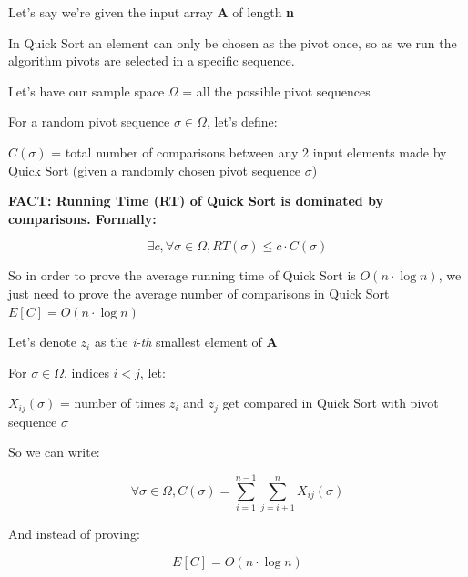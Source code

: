 \documentclass{article}
\begin{document}
Let's say we're given the input array \textbf{A} of length \textbf{n}

\bigskip

\noindent In Quick Sort an element can only be chosen as the pivot once, so as we run the algorithm pivots are selected in a specific sequence.

\bigskip

\noindent Let's have our sample space $\Omega$ = all the possible pivot sequences

\bigskip

\noindent For a random pivot sequence $\sigma \in \Omega$, let's define:

\bigskip

$C(\sigma)$ = total number of comparisons between any 2 input elements made by Quick Sort (given a randomly chosen pivot sequence $\sigma$)

\bigskip

\noindent \textbf{FACT: Running Time (RT) of Quick Sort is dominated by comparisons. Formally:}

\begin{equation*}
\boxed{\exists c, \forall \sigma \in \Omega, RT(\sigma) \leq c \cdot C(\sigma)}
\end{equation*}

\noindent So in order to prove the average running time of Quick Sort is $O(n \cdot \log n)$, we just need to prove the average number of comparisons in Quick Sort $E[C] = O(n \cdot \log n)$

\bigskip

\noindent Let's denote $z_i$ as the \textit{i-th} smallest element of \textbf{A}

\bigskip

\noindent For $\sigma \in \Omega$, indices $i < j$, let:

\bigskip

$X_{ij}(\sigma)$ = number of times $z_i$ and $z_j$ get compared in Quick Sort with pivot sequence $\sigma$


\bigskip

\noindent So we can write:

\begin{equation*}
\forall \sigma \in \Omega, C(\sigma) = \sum_{i=1}^{n-1} \sum_{j=i+1}^{n} X_{ij}(\sigma)
\end{equation*}

\bigskip

\noindent And instead of proving:

\begin{equation*}
E[C] = O(n \cdot \log n)
\end{equation*}
\end{document}
